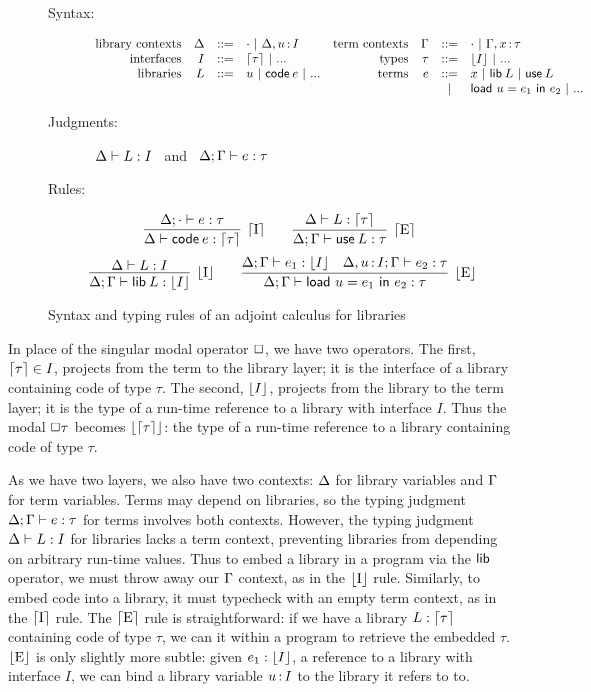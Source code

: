 \documentclass[11pt]{article}
\begin{document}
\begin{figure}[h]
  \centering
  \begin{description}
    \item[Syntax:]
    \[\begin{array}{rrclrrcl}
      \text{library contexts} & \Delta &::=& \cdot ~|~ \Delta, u \mathop{:} I &
      \text{term contexts} & \Gamma &::=& \cdot ~|~ \Gamma, x \mathop{:} \tau \\
      \text{interfaces} & I &::=& \lceil{\tau}\rceil ~|~ ... &
      \text{types} & \tau &::=& \lfloor{I}\rfloor ~|~ ...\\
      \text{libraries}& L &::=& u ~|~ \textsf{code}\:{e} ~|~ ... &
      \text{terms} & e &::=& x ~|~ \textsf{lib}\:{L} ~|~ \textsf{use}\:{L}\\
      &&&&&&~|~& \textsf{load}~{u}={e_1}~\textsf{in}~{e_2} ~|~ ...\\
    \end{array}\]
  \item[Judgments:]\ $\Delta \vdash L : I$ \ and
    \ $\Delta;\Gamma \vdash e : \tau$
  \item[Rules:]
    \[
    \infer[\up{\text{I}}]{\D \ent \code{e} \isa \up{\tau}}{
      \D;\ecx \ent e \isa \tau}
    \qquad
    \infer[\up{\text{E}}]{\D;\G \ent \use{L} \isa \tau}{
      \D \ent L \isa \up{\tau}}
    \]
    \[
    \infer[\dn{\text{I}}]{\D;\G \ent \lib{L} \isa \dn{I}}{
      \D \ent L \isa I}
    \qquad
    \infer[\dn{\text{E}}]{\D;\G \ent \load{u}{e_1}{e_2} \isa \tau}{
      \D;\G \ent e_1 \isa \dn{I} &
      \D,u \of I;\G \ent e_2 \isa \tau}
    \]
  \end{description}

  \caption{Syntax and typing rules of an adjoint calculus for libraries}
  \label{fig:adjoint}

\end{figure}

In place of the singular modal operator $\Box$, we have two operators. The
first, $\lceil{\tau}\rceil \in I$, projects from the term to the library layer; it is the
interface of a library containing code of type $\tau$. The second, $\lfloor{I}\rfloor$,
projects from the library to the term layer; it is the type of a run-time
reference to a library with interface $I$. Thus the modal $\Box \tau$ becomes
$\lfloor{\lceil{\tau}\rceil}\rfloor$: the type of a run-time reference to a library containing code
of type $\tau$.

As we have two layers, we also have two contexts: $\Delta$ for library variables and
$\Gamma$ for term variables. Terms may depend on libraries, so the typing judgment
$\Delta;\Gamma \vdash e : \tau$ for terms involves both contexts. However, the typing
judgment $\Delta \vdash L : I$ for libraries lacks a term context, preventing
libraries from depending on arbitrary run-time values. Thus to embed a library
in a program via the $\textsf{lib}$ operator, we must throw away our $\Gamma$ context,
as in the $\lfloor{\text{I}}\rfloor$ rule. Similarly, to embed code into a library, it must
typecheck with an empty term context, as in the $\lceil{\text{I}}\rceil$ rule. The
$\lceil{\text{E}}\rceil$ rule is straightforward: if we have a library $L : \lceil{\tau}\rceil$
containing code of type $\tau$, we can  it within a program to retrieve
the embedded $\tau$. $\lfloor{\text{E}}\rfloor$ is only slightly more subtle: given $e_1
: \lfloor{I}\rfloor$, a reference to a library with interface $I$, we can bind a library
variable $u \mathop{:} I$ to the library it refers to to.
\end{document}
